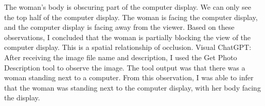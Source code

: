 \begin{enumerate}
        The woman's body is obscuring part of the computer display.
        We can only see the top half of the computer display.
        The woman is facing the computer display, and the computer display is facing away from the viewer.
        Based on these observations, I concluded that the woman is partially blocking the view of the computer display. This is a spatial relationship of occlusion.
        \subitem Visual ChatGPT: After receiving the image file name and description, I used the Get Photo Description tool to observe the image. The tool output was that there was a woman standing next to a computer. From this observation, I was able to infer that the woman was standing next to the computer display, with her body facing the display.
    \end{enumerate}